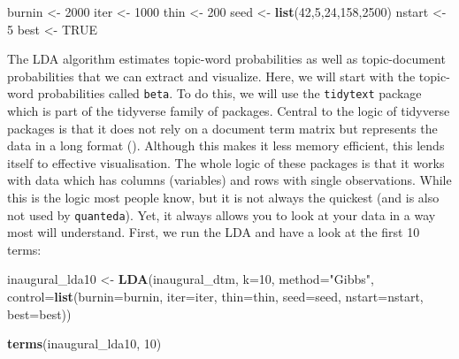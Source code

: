 \documentclass[
]{book}
\newenvironment{Shaded}{\begin{snugshade}}{\end{snugshade}}
\newcommand{\AttributeTok}[1]{\textcolor[rgb]{0.13,0.29,0.53}{#1}}
\newcommand{\ConstantTok}[1]{\textcolor[rgb]{0.56,0.35,0.01}{#1}}
\newcommand{\DecValTok}[1]{\textcolor[rgb]{0.00,0.00,0.81}{#1}}
\newcommand{\FunctionTok}[1]{\textcolor[rgb]{0.13,0.29,0.53}{\textbf{#1}}}
\newcommand{\NormalTok}[1]{#1}
\newcommand{\OtherTok}[1]{\textcolor[rgb]{0.56,0.35,0.01}{#1}}
\newcommand{\StringTok}[1]{\textcolor[rgb]{0.31,0.60,0.02}{#1}}
\begin{document}
\begin{Shaded}
\begin{Highlighting}[]
\NormalTok{burnin }\OtherTok{\textless{}{-}} \DecValTok{2000}
\NormalTok{iter }\OtherTok{\textless{}{-}} \DecValTok{1000}
\NormalTok{thin }\OtherTok{\textless{}{-}} \DecValTok{200}
\NormalTok{seed }\OtherTok{\textless{}{-}} \FunctionTok{list}\NormalTok{(}\DecValTok{42}\NormalTok{,}\DecValTok{5}\NormalTok{,}\DecValTok{24}\NormalTok{,}\DecValTok{158}\NormalTok{,}\DecValTok{2500}\NormalTok{)}
\NormalTok{nstart }\OtherTok{\textless{}{-}} \DecValTok{5}
\NormalTok{best }\OtherTok{\textless{}{-}} \ConstantTok{TRUE}
\end{Highlighting}
\end{Shaded}

The LDA algorithm estimates topic-word probabilities as well as topic-document probabilities that we can extract and visualize. Here, we will start with the topic-word probabilities called \texttt{beta}. To do this, we will use the \texttt{tidytext} package which is part of the tidyverse family of packages. Central to the logic of tidyverse packages is that it does not rely on a document term matrix but represents the data in a long format (). Although this makes it less memory efficient, this lends itself to effective visualisation. The whole logic of these packages is that it works with data which has columns (variables) and rows with single observations. While this is the logic most people know, but it is not always the quickest (and is also not used by \texttt{quanteda}). Yet, it always allows you to look at your data in a way most will understand. First, we run the LDA and have a look at the first 10 terms:

\begin{Shaded}
\begin{Highlighting}[]
\NormalTok{inaugural\_lda10 }\OtherTok{\textless{}{-}} \FunctionTok{LDA}\NormalTok{(inaugural\_dtm, }\AttributeTok{k=}\DecValTok{10}\NormalTok{,}
                       \AttributeTok{method=}\StringTok{"Gibbs"}\NormalTok{,}
                       \AttributeTok{control=}\FunctionTok{list}\NormalTok{(}\AttributeTok{burnin=}\NormalTok{burnin,}
                                    \AttributeTok{iter=}\NormalTok{iter,}
                                    \AttributeTok{thin=}\NormalTok{thin,}
                                    \AttributeTok{seed=}\NormalTok{seed,}
                                    \AttributeTok{nstart=}\NormalTok{nstart,}
                                    \AttributeTok{best=}\NormalTok{best))}

\FunctionTok{terms}\NormalTok{(inaugural\_lda10, }\DecValTok{10}\NormalTok{)}
\end{Highlighting}
\end{Shaded}
\end{document}
